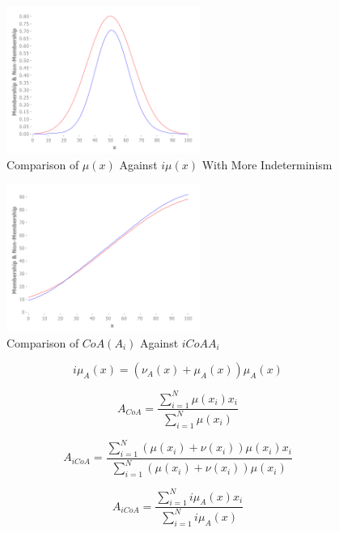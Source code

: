 \documentclass[conference]{IEEEtran}
\begin{document}
\begin{figure}[!t]
  \centering
  \includegraphics[width=2.5in]{if-membership-drastic}
  \caption{Comparison of $\mu(x)$ Against $i\mu(x)$ With More Indeterminism}
  \label{if-membership-drastic}
\end{figure}

\begin{figure}[!t]
  \centering
  \includegraphics[width=2.5in]{if-coa-vs-coa}
  \caption{Comparison of $CoA(A_{i})$ Against $iCoA{A_{i}}$}
  \label{if-coa-vs-coa}
\end{figure}

\begin{equation}
  i\mu_{A}(x) = (\nu_{A}(x) + \mu_{A}(x))\mu_{A}(x)
\end{equation}

\begin{equation}
  A_{CoA} = \dfrac{\sum_{i=1}^{N} \mu(x_{i})
    x_{i}}{\sum_{i=1}^{N} \mu(x_{i})}
\end{equation}

\begin{equation}
  A_{iCoA} = \dfrac{\sum_{i=1}^{N} (\mu(x_{i}) + \nu(x_{i})) \mu(x_{i})
    x_{i}}{\sum_{i=1}^{N} (\mu(x_{i}) + \nu(x_{i})) \mu(x_{i})}
\end{equation}

\begin{equation}
  A_{iCoA} = \dfrac{\sum_{i=1}^{N} i\mu_{A}(x) x_{i}}{\sum_{i=1}^{N}
    i\mu_{A}(x)}
\end{equation}
\end{document}
